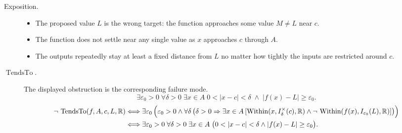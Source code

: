 \begin{remark*}
\begin{description}
  \item[Exposition.]
  \begin{itemize}
    \item The proposed value $L$ is the wrong target: the function approaches
    some value $M\neq L$ near $c$.
    \item The function does not settle near any single value as $x$ approaches
    $c$ through $A$.
    \item The outputs repeatedly stay at least a fixed distance from $L$ no
    matter how tightly the inputs are restricted around $c$.
  \end{itemize}


  \item[\(\operatorname{TendsTo}.\)]
  The displayed obstruction is the corresponding failure mode.
  \[
\exists\varepsilon_0 > 0\;\forall\delta > 0\;\exists x \in A\;
  0<|x-c|<\delta\;\wedge\; |f(x)-L|\geq\varepsilon_0.
  \]
  \[
\begin{aligned}
  \neg\,\operatorname{TendsTo}(f,A,c,L,\mathbb{R})
  &\Longleftrightarrow
  \exists \varepsilon_0\,
  \Bigl(
    \varepsilon_0>0
    \wedge
    \forall \delta\,
    \bigl(
      \delta>0
      \Rightarrow
      \exists x\in A\,
      [
        \operatorname{Within}(x,I^\times_\delta(c),\mathbb R)
        \wedge
        \neg\,\operatorname{Within}(f(x),I_{\varepsilon_0}(L),\mathbb R)
      ]
    \bigr)
  \Bigr)\\
  &\Longleftrightarrow
  \exists \varepsilon_0>0\;
  \forall \delta>0\;
  \exists x\in A\;
  \bigl(
    0<|x-c|<\delta
    \wedge
    |f(x)-L|\geq\varepsilon_0
  \bigr).
\end{aligned}
  \]
\end{description}
\end{remark*}

